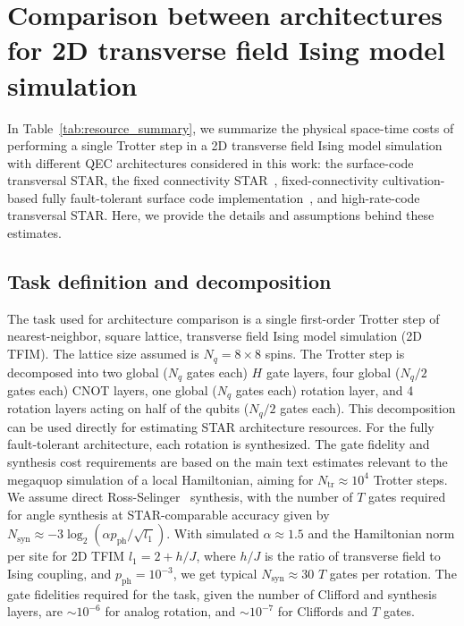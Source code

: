 \documentclass[aps, prx, reprint, superscriptaddress, longbibliography, floatfix]{revtex4-2}
\begin{document}
\section{Comparison between  architectures for 2D transverse field Ising model simulation}
\label{sec:space-time_comparison}

In Table~\ref{tab:resource_summary}, we summarize the physical space-time costs of performing a single Trotter step in a 2D transverse field Ising model simulation with different QEC architectures considered in this work: the surface-code transversal STAR, the fixed connectivity STAR~\cite{Akahoshi2024, Toshio2024}, fixed-connectivity cultivation-based fully fault-tolerant surface code implementation~\cite{Gidney2024}, and high-rate-code transversal STAR. Here, we provide the details and assumptions behind these estimates.

\subsection{Task definition and decomposition}

The task used for architecture comparison is a single first-order Trotter step of nearest-neighbor, square lattice, transverse field Ising model simulation (2D TFIM). The lattice size assumed is $N_q=8\times 8$ spins. The Trotter step is decomposed into two global ($N_q$ gates each) $H$ gate layers, four global ($N_q/2$ gates each) CNOT layers, one global ($N_q$ gates each) rotation layer, and 4 rotation layers acting on half of the qubits ($N_q/2$ gates each). This decomposition can be used directly for estimating STAR architecture resources. For the fully fault-tolerant architecture, each rotation is synthesized. The gate fidelity and synthesis cost requirements are based on the main text estimates relevant to the megaquop simulation of a local Hamiltonian, aiming for $N_{\mathrm{tr}}\approx 10^4$ Trotter steps. We assume direct Ross-Selinger~\cite{Ross2016} synthesis, with the number of $T$ gates required for angle synthesis at STAR-comparable accuracy given by  $N_{\mathrm{syn}} \approx -3\log_2{(\alpha p_{\mathrm{ph}}/\sqrt{l_1})}$. With simulated $\alpha \approx 1.5$ and the Hamiltonian norm per site for 2D TFIM $l_1=2+h/J$, where $h/J$ is the ratio of transverse field to Ising coupling, and $p_{\mathrm{ph}}=10^{-3}$, we get typical $N_{\mathrm{syn}}\approx 30$ $T$ gates per rotation. The gate fidelities required for the task, given the number of Clifford and synthesis layers, are $\sim 10^{-6}$ for analog rotation, and $\sim 10^{-7}$ for Cliffords and $T$ gates. 
\end{document}

